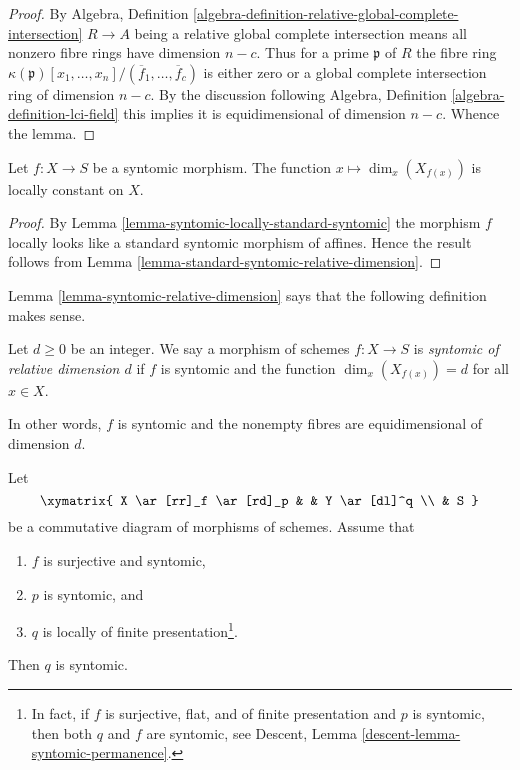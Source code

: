 \begin{proof}
By Algebra,
Definition \ref{algebra-definition-relative-global-complete-intersection}
$R \to A$ being a relative global complete intersection means
all nonzero fibre rings have dimension $n - c$.
Thus for a prime $\mathfrak p$ of $R$ the fibre ring
$\kappa(\mathfrak p)[x_1, \ldots, x_n]/(\overline{f}_1, \ldots, \overline{f}_c)$
is either zero or a global complete intersection ring of dimension $n - c$.
By the discussion following
Algebra, Definition \ref{algebra-definition-lci-field}
this implies it is equidimensional of dimension $n - c$.
Whence the lemma.
\end{proof}

\begin{lemma}
\label{lemma-syntomic-relative-dimension}
Let $f : X \to S$ be a syntomic morphism. The function
$x \mapsto \dim_x(X_{f(x)})$ is locally constant on $X$.
\end{lemma}

\begin{proof}
By Lemma \ref{lemma-syntomic-locally-standard-syntomic}
the morphism $f$ locally looks like a standard
syntomic morphism of affines. Hence the result follows
from Lemma \ref{lemma-standard-syntomic-relative-dimension}.
\end{proof}

\noindent
Lemma \ref{lemma-syntomic-relative-dimension}
says that the following definition makes sense.

\begin{definition}
\label{definition-syntomic-relative-dimension}
Let $d \geq 0$ be an integer. We say a morphism of schemes $f : X \to S$
is {\it syntomic of relative dimension $d$} if $f$ is syntomic and
the function $\dim_x(X_{f(x)}) = d$ for all $x \in X$.
\end{definition}

\noindent
In other words, $f$ is syntomic and the nonempty fibres are equidimensional
of dimension $d$.

\begin{lemma}
\label{lemma-syntomic-permanence}
Let
$$
\xymatrix{
X \ar[rr]_f \ar[rd]_p & &
Y \ar[dl]^q \\
& S
}
$$
be a commutative diagram of morphisms of schemes. Assume that
\begin{enumerate}
\item $f$ is surjective and syntomic,
\item $p$ is syntomic, and
\item $q$ is locally of finite presentation\footnote{In fact, if
$f$ is surjective, flat, and of finite presentation and $p$ is syntomic,
then both $q$ and $f$ are syntomic, see
Descent, Lemma \ref{descent-lemma-syntomic-permanence}.}.
\end{enumerate}
Then $q$ is syntomic.
\end{lemma}

